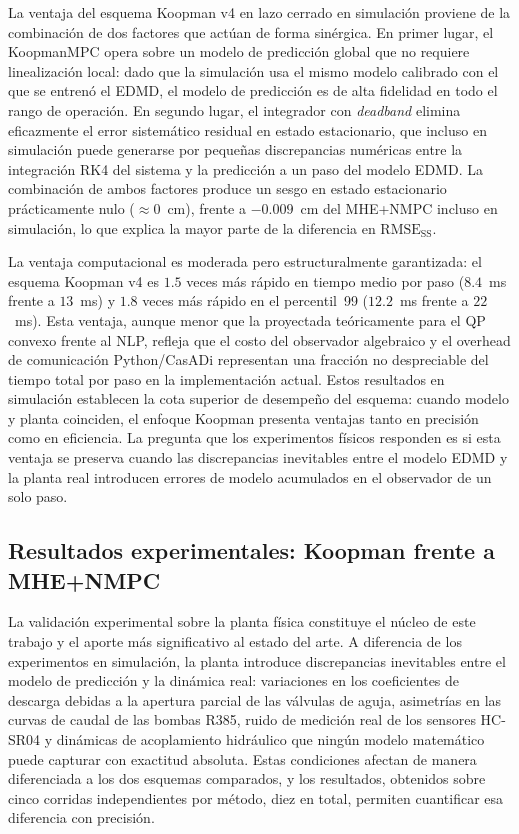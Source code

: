 \documentclass[12pt,letterpaper]{article}
\begin{document}
La ventaja del esquema Koopman v4 en lazo cerrado en simulación 
proviene de la combinación de dos factores que actúan de forma 
sinérgica. En primer lugar, el KoopmanMPC opera sobre un modelo de 
predicción global que no requiere linealización local: dado que la 
simulación usa el mismo modelo calibrado con el que se entrenó el 
EDMD, el modelo de predicción es de alta fidelidad en todo el rango 
de operación. En segundo lugar, el integrador con \textit{deadband} 
elimina eficazmente el error sistemático residual en estado 
estacionario, que incluso en simulación puede generarse por 
pequeñas discrepancias numéricas entre la integración RK4 del 
sistema y la predicción a un paso del modelo EDMD. La combinación 
de ambos factores produce un sesgo en estado estacionario 
prácticamente nulo ($\approx 0$~cm), frente a $-0.009$~cm del 
MHE+NMPC incluso en simulación, lo que explica la mayor parte de 
la diferencia en $\mathrm{RMSE}_{\mathrm{SS}}$.

La ventaja computacional es moderada pero estructuralmente
garantizada: el esquema Koopman v4 es $1.5$ veces más rápido
en tiempo medio por paso ($8.4$~ms frente a $13$~ms) y $1.8$
veces más rápido en el percentil~99 ($12.2$~ms frente a
$22$~ms). Esta ventaja, aunque menor que la proyectada 
teóricamente para el QP convexo frente al NLP, refleja que 
el costo del observador algebraico y el overhead de comunicación 
Python/CasADi representan una fracción no despreciable del tiempo 
total por paso en la implementación actual. Estos resultados en 
simulación establecen la cota superior de desempeño del esquema: 
cuando modelo y planta coinciden, el enfoque Koopman presenta 
ventajas tanto en precisión como en eficiencia. La pregunta que 
los experimentos físicos responden es si esta ventaja se preserva 
cuando las discrepancias inevitables entre el modelo EDMD y la 
planta real introducen errores de modelo acumulados en el 
observador de un solo paso.

\subsection{Resultados experimentales: Koopman frente a MHE+NMPC}
\label{sec:analisis_exp}

La validación experimental sobre la planta física constituye el 
núcleo de este trabajo y el aporte más significativo al estado del 
arte. A diferencia de los experimentos en simulación, la planta 
introduce discrepancias inevitables entre el modelo de predicción 
y la dinámica real: variaciones en los coeficientes de descarga 
debidas a la apertura parcial de las válvulas de aguja, asimetrías 
en las curvas de caudal de las bombas R385, ruido de medición real 
de los sensores HC-SR04 y dinámicas de acoplamiento hidráulico que 
ningún modelo matemático puede capturar con exactitud absoluta. 
Estas condiciones afectan de manera diferenciada a los dos esquemas
comparados, y los resultados, obtenidos sobre cinco corridas
independientes por método, diez en total, permiten cuantificar
esa diferencia con precisión.
\end{document}
